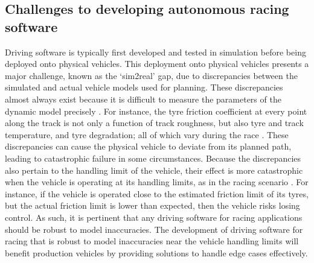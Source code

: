 \subsection{Challenges to developing autonomous racing software}
\label{sec:auto_race_challenges}
Driving software is typically first developed and tested in simulation before being deployed onto physical vehicles.
This deployment onto physical vehicles presents a major challenge, known as the `sim2real' gap, due to discrepancies between the simulated and actual vehicle models used for planning. 
These discrepancies almost always exist because it is difficult to measure the parameters of the dynamic model precisely \cite{Hewing2018}. For instance, the tyre friction coefficient at every point along the track is not only a function of track roughness, but also tyre and track temperature, and tyre degradation; all of which vary during the race \cite{Sharp2016}.
These discrepancies can cause the physical vehicle to deviate from its planned path, leading to catastrophic failure in some circumstances.
Because the discrepancies also pertain to the handling limit of the vehicle, their effect is more catastrophic when the vehicle is operating at its handling limits, as in the racing scenario \cite{Hewing2018}. 
For instance, if the vehicle is operated close to the estimated friction limit of its tyres, but the actual friction limit is lower than expected, then the vehicle risks losing control.
As such, it is pertinent that any driving software for racing applications should be robust to model inaccuracies.
The development of driving software for racing that is robust to model inaccuracies near the vehicle handling limits will benefit production vehicles by providing solutions to handle edge cases effectively.

